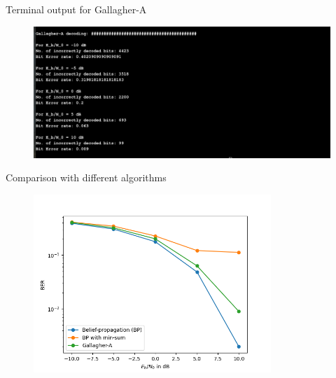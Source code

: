 \begin{frame}
\begin{block}{Terminal output for Gallagher-A}
    \begin{figure}
		\includegraphics[width=\textwidth]{AWGN/terminalAWGN_2.png}
	\end{figure}
\end{block}

\end{frame}

\begin{frame}
\begin{block}{Comparison with different algorithms}
    \begin{figure}
		\includegraphics[width=0.8\textwidth]{AWGN/AWGN.png}
	\end{figure}
\end{block}

\end{frame}